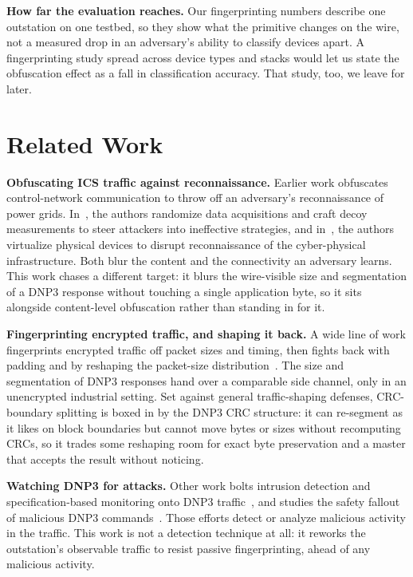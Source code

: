 \documentclass[conference]{IEEEtran}
\begin{document}
\noindent\textbf{How far the evaluation reaches.} Our fingerprinting numbers
describe one outstation on one testbed, so they show what the primitive changes on
the wire, not a measured drop in an adversary's ability to classify devices apart.
A fingerprinting study spread across device types and stacks would let us state
the obfuscation effect as a fall in classification accuracy. That study, too, we
leave for later.

\section{Related Work}

\noindent\textbf{Obfuscating ICS traffic against reconnaissance.} Earlier work
obfuscates control-network communication to throw off an adversary's
reconnaissance of power grids. In~\cite{ref:raincoat}, the authors randomize data
acquisitions and craft decoy measurements to steer attackers into ineffective
strategies, and in~\cite{ref:defrec}, the authors virtualize physical devices to
disrupt reconnaissance of the cyber-physical infrastructure. Both blur the content
and the connectivity an adversary learns. This work chases a different target: it
blurs the wire-visible size and segmentation of a DNP3 response without touching a
single application byte, so it sits alongside content-level obfuscation rather
than standing in for it.

\noindent\textbf{Fingerprinting encrypted traffic, and shaping it back.} A wide
line of work fingerprints encrypted traffic off packet sizes and timing, then
fights back with padding and by reshaping the packet-size
distribution~\cite{ref:fp}. The size and segmentation of DNP3 responses hand over
a comparable side channel, only in an unencrypted industrial setting. Set against
general traffic-shaping defenses, CRC-boundary splitting is boxed in by the DNP3
CRC structure: it can re-segment as it likes on block boundaries but cannot move
bytes or sizes without recomputing CRCs, so it trades some reshaping room for
exact byte preservation and a master that accepts the result without noticing.

\noindent\textbf{Watching DNP3 for attacks.} Other work bolts intrusion detection
and specification-based monitoring onto DNP3 traffic~\cite{ref:bro}, and studies
the safety fallout of malicious DNP3 commands~\cite{ref:cps}. Those efforts detect
or analyze malicious activity in the traffic. This work is not a detection
technique at all: it reworks the outstation's observable traffic to resist passive
fingerprinting, ahead of any malicious activity.
\end{document}
